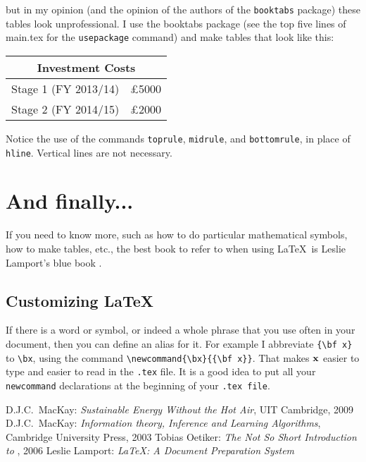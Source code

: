 \documentclass[12pt]{article}
\begin{document}
but in my opinion (and the opinion of the authors of the {\tt{booktabs}}
package) these tables look unprofessional.
I use the booktabs package (see the top five lines of
main.tex for the {\tt{usepackage}} command) and make tables that look like this:
\begin{center}
\begin{tabular}{lr} 
\toprule
 \multicolumn{2}{c}{ {\sc Investment Costs} } \\ 
 \midrule
 Stage 1 (FY 2013/14)   & \pounds 5000 \\
 Stage 2 (FY 2014/15)	& \pounds 2000 \\ 
 \bottomrule
\end{tabular}
\end{center}
Notice the use of the commands {\tt{toprule}},  {\tt{midrule}},
and  {\tt{bottomrule}}, in place of {\tt{hline}}.
Vertical lines are not necessary.

\appendix
\section{And finally...}
If you need to know more, such as how to do particular mathematical symbols, how to make tables, etc., the best book to refer to when
using \LaTeX\ is Leslie Lamport's blue book \cite{lamport}.

\subsection{Customizing \LaTeX}
If there is a word or symbol, or indeed a whole phrase that you use
often in your document, then you can define an alias for it. For
example I abbreviate \verb+{\bf x}+ to \verb+\bx+, using the command
\verb+\newcommand{\bx}{{\bf x}}+.
\newcommand{\bx}{{\bf x}}
That makes $\bx$ easier to type and easier to read in the {\tt .tex}
file.  It is a good idea to put all your \verb+newcommand+
declarations at the beginning of your {\tt .tex file}.

\begin{thebibliography}{99}
\label{bib}
 D.J.C.~MacKay: \emph{Sustainable Energy Without the Hot Air}, UIT Cambridge, 2009
 D.J.C.~MacKay: \emph{Information theory, Inference and Learning Algorithms}, Cambridge University Press, 2003
 Tobias Oetiker: \emph{The Not So Short Introduction to \LaTeXe}, 2006
 Leslie Lamport: \emph{\LaTeX: A Document Preparation System}
\end{thebibliography}
\end{document}
